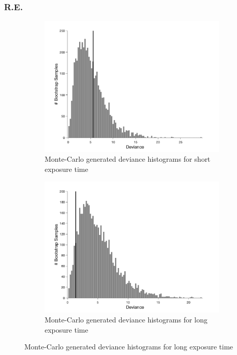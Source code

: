 \documentclass{article}
\begin{document}
\subsubsection*{R.E.}
\begin{figure}[!hb]
    \begin{subfigure}{0.494\textwidth}
        \centering
        \includegraphics[width = \linewidth]{Thesis/plots/gof/cutNo/cutNo_re_short_bootstrap.png}
        \caption{Monte-Carlo generated deviance histograms for short exposure time}
        \label{fig:da_gof_short_bootstrap}
    \end{subfigure}
    \hspace{0.01\textwidth}
    \begin{subfigure}{0.494\textwidth}
        \centering
        \includegraphics[width = \linewidth]{Thesis/plots/gof/cutNo/cutNo_re_long_bootstrap.png}
        \caption{Monte-Carlo generated deviance histograms for long exposure time}
        \label{fig:da_gof_long_bootstrap}
    \end{subfigure}
    

\end{figure}
\end{document}
